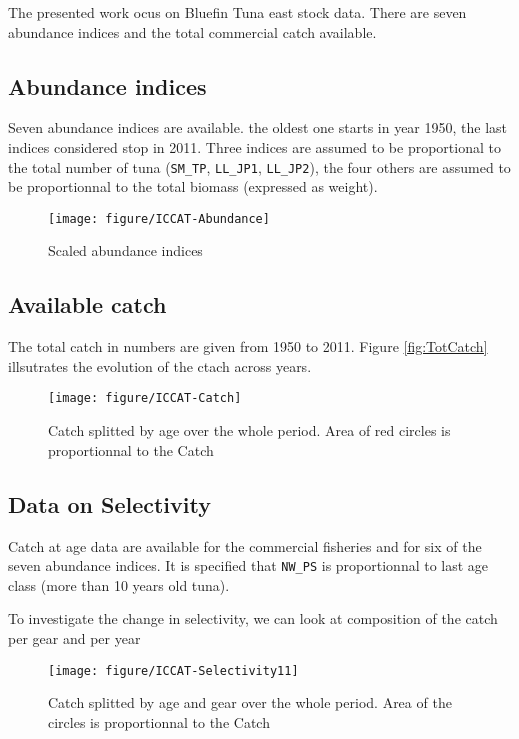 The presented  work ocus on  Bluefin Tuna  east stock data.  There are
seven abundance indices and the total commercial catch available. 





\subsection{Abundance indices}

Seven abundance indices are available.   the oldest one starts in year
1950,  the last  indices considered  stop in  2011. Three  indices are
assumed to be proportional to  the total number of tuna (\verb+SM_TP+,
\verb+LL_JP1+,  \verb+LL_JP2+),  the four  others  are  assumed to  be
proportionnal to the total biomass (expressed as weight).

\begin{figure}
{\centering \texttt{[image: figure/ICCAT-Abundance]} 
}
\caption{Scaled abundance indices }
\end{figure}




\subsection{Available catch}
The  total catch  in  numbers  are given  from  1950  to 2011.  Figure
\ref{fig:TotCatch} illsutrates the evolution of the ctach across years.
\begin{figure}
\centering \texttt{[image: figure/ICCAT-Catch]} 
\caption{Catch  splitted by  age over  the whole  period. Area  of red
  circles is proportionnal to the Catch}
\label{fig:Totcatch}
\end{figure}


\subsection{Data on Selectivity}
Catch at age  data are available for the commercial  fisheries and for
six of the seven abundance  indices. It is specified that \verb+NW_PS+
is proportionnal to last age class (more than 10 years old tuna).




To investigate the  change in selectivity, we can  look at composition
of the catch per gear and per year
\begin{figure}
{\centering \texttt{[image: figure/ICCAT-Selectivity11]} 
}
\caption{Catch splitted by age and gear over the whole period. Area of the
  circles is proportionnal to the Catch}
\end{figure}




